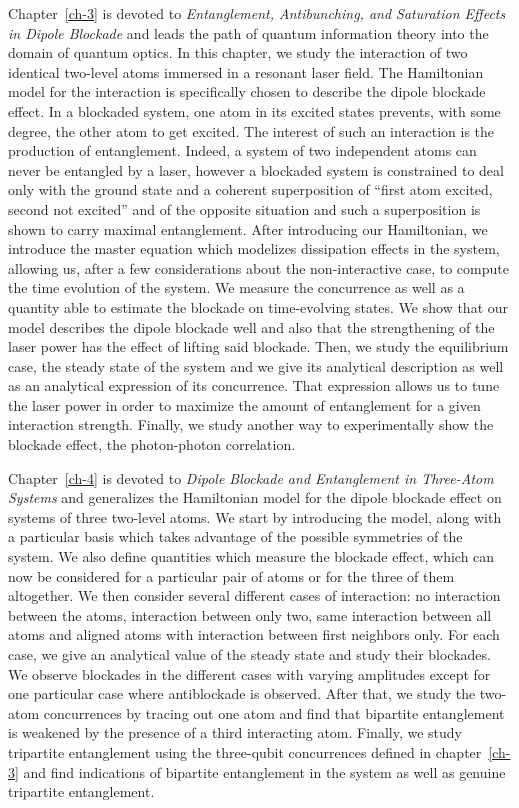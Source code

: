 Chapter~\ref{ch-3} is devoted to \textit{Entanglement, Antibunching, and Saturation Effects in Dipole Blockade} and leads the path of quantum information theory into the domain of quantum optics. In this chapter, we study the interaction of two identical two-level atoms immersed in a resonant laser field. The Hamiltonian model for the interaction is specifically chosen to describe the dipole blockade effect. In a blockaded system, one atom in its excited states prevents, with some degree, the other atom to get excited. The interest of such an interaction is the production of entanglement. Indeed, a system of two independent atoms can never be entangled by a laser, however a blockaded system is constrained to deal only with the ground state and a coherent superposition of ``first atom excited, second not excited'' and of the opposite situation and such a superposition is shown to carry maximal entanglement. After introducing our Hamiltonian, we introduce the master equation which modelizes dissipation effects in the system, allowing us, after a few considerations about the non-interactive case, to compute the time evolution of the system. We measure the concurrence as well as a quantity able to estimate the blockade on time-evolving states. We show that our model describes the dipole blockade well and also that the strengthening of the laser power has the effect of lifting said blockade. Then, we study the equilibrium case, the steady state of the system and we give its analytical description as well as an analytical expression of its concurrence. That expression allows us to tune the laser power in order to maximize the amount of entanglement for a given interaction strength. Finally, we study another way to experimentally show the blockade effect, the photon-photon correlation.

Chapter~\ref{ch-4} is devoted to \textit{Dipole Blockade and Entanglement in Three-Atom Systems} and generalizes the Hamiltonian model for the dipole blockade effect on systems of three two-level atoms. We start by introducing the model, along with a particular basis which takes advantage of the possible symmetries of the system. We also define quantities which measure the blockade effect, which can now be considered for a particular pair of atoms or for the three of them altogether. We then consider several different cases of interaction:  no interaction between the atoms, interaction between only two, same interaction between all atoms and aligned atoms with interaction between first neighbors only. For each case, we give an analytical value of the steady state and study their blockades. We observe blockades in the different cases with varying amplitudes except for one particular case where antiblockade is observed. After that, we study the two-atom concurrences by tracing out one atom and find that bipartite entanglement is weakened by the presence of a third interacting atom. Finally, we study tripartite entanglement using the three-qubit concurrences defined in chapter~\ref{ch-3} and find indications of bipartite entanglement in the system as well as genuine tripartite entanglement. 

